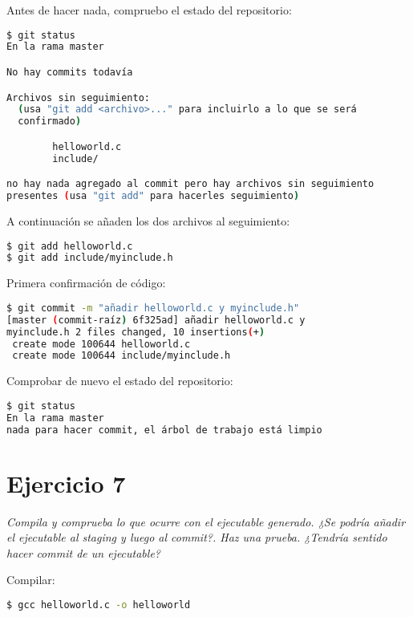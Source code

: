Antes de hacer nada, compruebo el estado del repositorio:
\begin{lstlisting}[basicstyle=\small,xrightmargin=.10\textwidth,xleftmargin=.10\textwidth,language=bash]
$ git status
En la rama master

No hay commits todavía

Archivos sin seguimiento:
  (usa "git add <archivo>..." para incluirlo a lo que se será 
  confirmado)

        helloworld.c
        include/

no hay nada agregado al commit pero hay archivos sin seguimiento 
presentes (usa "git add" para hacerles seguimiento)
\end{lstlisting}

A continuación se añaden los dos archivos al seguimiento:
\begin{lstlisting}[basicstyle=\small,xrightmargin=.10\textwidth,xleftmargin=.10\textwidth,language=bash]
$ git add helloworld.c
$ git add include/myinclude.h
\end{lstlisting}

Primera confirmación de código:
\begin{lstlisting}[basicstyle=\small,xrightmargin=.10\textwidth,xleftmargin=.10\textwidth,language=bash]
$ git commit -m "añadir helloworld.c y myinclude.h"
[master (commit-raíz) 6f325ad] añadir helloworld.c y
myinclude.h 2 files changed, 10 insertions(+)
 create mode 100644 helloworld.c
 create mode 100644 include/myinclude.h
\end{lstlisting}


Comprobar de nuevo el estado del repositorio:
\begin{lstlisting}[basicstyle=\small,xrightmargin=.10\textwidth,xleftmargin=.10\textwidth,language=bash]
$ git status
En la rama master
nada para hacer commit, el árbol de trabajo está limpio
\end{lstlisting}

\section{Ejercicio 7}
\begin{center}
    \parbox{12cm}{\justify\textit{
        Compila y comprueba lo que ocurre con el ejecutable generado. ¿Se podría añadir el ejecutable al staging y luego al commit?. Haz una prueba. ¿Tendría sentido hacer commit de un ejecutable?
    }}
\end{center}

Compilar:
\begin{lstlisting}[basicstyle=\small,xrightmargin=.10\textwidth,xleftmargin=.10\textwidth,language=bash]
$ gcc helloworld.c -o helloworld
\end{lstlisting}


